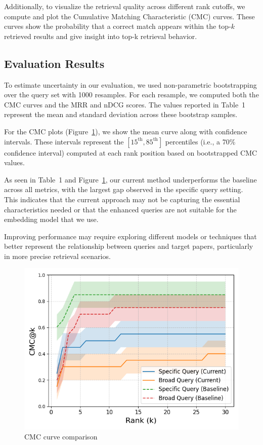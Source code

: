 \documentclass[fleqn,moreauthors,10pt]{ds_report}
\begin{document}
Additionally, to visualize the retrieval quality across different rank cutoffs, we compute and plot the Cumulative Matching Characteristic (CMC) curves.
These curves show the probability that a correct match appears within the top-$k$ retrieved results and give insight into top-k retrieval behavior.

\subsection*{Evaluation Results}

To estimate uncertainty in our evaluation, we used non-parametric bootstrapping over the query set with 1000 resamples. 
For each resample, we computed both the CMC curves and the MRR and nDCG scores.
The values reported in Table~1 represent the mean and standard deviation across these bootstrap samples.

For the CMC plots (Figure~\ref{fig:cmc}), we show the mean curve along with confidence intervals.
These intervals represent the $[15^\text{th}, 85^\text{th}]$ percentiles (i.e., a 70\% confidence interval)
computed at each rank position based on bootstrapped CMC values.

As seen in Table~1 and Figure~\ref{fig:cmc}, our current method underperforms the baseline across all metrics,
with the largest gap observed in the specific query setting.
This indicates that the current approach may not be capturing the essential characteristics needed or that the enhanced queries are not suitable for the embedding model that we use.

Improving performance may require exploring different models or techniques that better represent
the relationship between queries and target papers, particularly in more precise retrieval scenarios.

\begin{figure}[h]
    \centering
    \includegraphics[width=\columnwidth]{fig/cmc.png}
    \caption{CMC curve comparison}
    \label{fig:cmc}
\end{figure}
\end{document}
